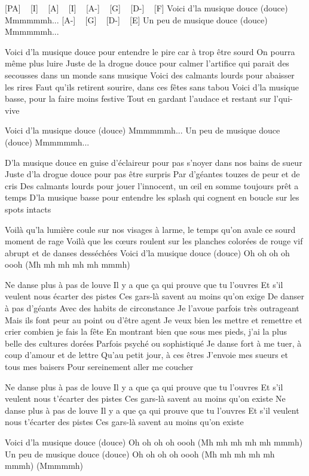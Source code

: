 [PA] ~ [I] ~ [A] ~ [I] ~
[A-] ~ [G] ~ [D-] ~ [F]
Voici d'la musique douce (douce)
Mmmmmmh...
[A-] ~ [G] ~ [D-] ~ [E]
Un peu de musique douce (douce)
Mmmmmmh...

Voici d'la musique douce pour entendre le pire car à trop être sourd
On pourra même plus luire
Juste de la drogue douce pour calmer l'artifice qui parait des secousses dans un monde sans musique
Voici des calmants lourds pour abaisser les rires
Faut qu'ils retirent sourire, dans ces fêtes sans tabou
Voici d'la musique basse, pour la faire moins festive
Tout en gardant l'audace et restant sur l'qui-vive


Voici d'la musique douce (douce)
Mmmmmmh...
Un peu de musique douce (douce)
Mmmmmmh...


D'la musique douce en guise d'éclaireur pour pas s'noyer dans nos bains de sueur
Juste d'la drogue douce pour pas être surpris
Par d'géantes touzes de peur et de cris
Des calmants lourds pour jouer l’innocent, un œil en somme toujours prêt a temps
D'la musique basse pour entendre les splash qui cognent en boucle sur les spots intacts


Voilà qu'la lumière coule sur nos visages à larme, le temps qu'on avale ce sourd moment de rage
Voilà que les cœurs roulent sur les planches colorées de rouge vif abrupt et de danses desséchées
Voici d'la musique douce (douce)
Oh oh oh oh oooh (Mh mh mh mh mh mmmh)


Ne danse plus à pas de louve
Il y a que ça qui prouve que tu l'ouvres
Et s'il veulent nous écarter des pistes
Ces gars-là savent au moins qu'on exige
De danser à pas d'géants
Avec des habits de circonstance
Je l'avoue parfois très outrageant
Mais ils font peur au point ou d'être agent
Je veux bien les mettre et remettre et crier combien je fais la fête
En montrant bien que sous mes pieds, j'ai la plus belle des cultures dorées
Parfois psyché ou sophistiqué
Je danse fort à me tuer, à coup d'amour et de lettre
Qu'au petit jour, à ces êtres
J'envoie mes sueurs et tous mes baisers
Pour sereinement aller me coucher

Ne danse plus à pas de louve
Il y a que ça qui prouve que tu l'ouvres
Et s'il veulent nous t'écarter des pistes
Ces gars-là savent au moins qu'on existe
Ne danse plus à pas de louve
Il y a que ça qui prouve que tu l'ouvres
Et s'il veulent nous t'écarter des pistes
Ces gars-là savent au moins qu'on existe

Voici d'la musique douce (douce)
Oh oh oh oh oooh (Mh mh mh mh mh mmmh)
Un peu de musique douce (douce)
Oh oh oh oh oooh (Mh mh mh mh mh mmmh)
(Mmmmmh)